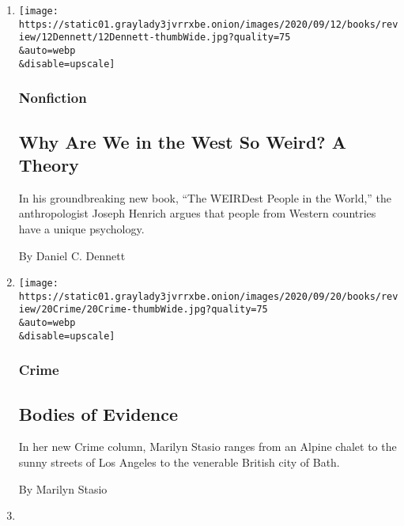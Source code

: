\begin{enumerate}
\def\labelenumi{\arabic{enumi}.}
\item
  \href{/2020/09/12/books/review/the-weirdest-people-in-the-world-joseph-henrich.html}{}

  \texttt{[image: https://static01.graylady3jvrrxbe.onion/images/2020/09/12/books/review/12Dennett/12Dennett-thumbWide.jpg?quality=75\\\&auto=webp\\\&disable=upscale]}

  \hypertarget{nonfiction-4}{%
  \subsubsection{Nonfiction}\label{nonfiction-4}}

  \hypertarget{why-are-we-in-the-west-so-weird-a-theory}{%
  \subsection{Why Are We in the West So Weird? A
  Theory}\label{why-are-we-in-the-west-so-weird-a-theory}}

  In his groundbreaking new book, ``The WEIRDest People in the World,''
  the anthropologist Joseph Henrich argues that people from Western
  countries have a unique psychology.

  By Daniel C. Dennett
\item
  \href{/2020/09/11/books/review/crime-fiction-ruth-ware-peter-lovesey.html}{}

  \texttt{[image: https://static01.graylady3jvrrxbe.onion/images/2020/09/20/books/review/20Crime/20Crime-thumbWide.jpg?quality=75\\\&auto=webp\\\&disable=upscale]}

  \hypertarget{crime}{%
  \subsubsection{Crime}\label{crime}}

  \hypertarget{bodies-of-evidence}{%
  \subsection{Bodies of Evidence}\label{bodies-of-evidence}}

  In her new Crime column, Marilyn Stasio ranges from an Alpine chalet
  to the sunny streets of Los Angeles to the venerable British city of
  Bath.

  By Marilyn Stasio
\item
  \href{/2020/09/11/books/review/aimee-nezhukumatathil-world-of-wonders.html}{}


\end{enumerate}
